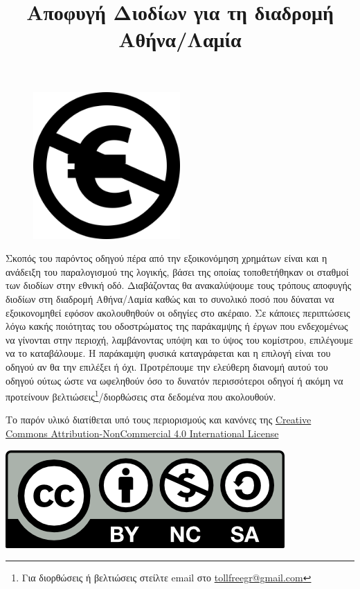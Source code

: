 \documentclass[a4paper,12pt]{article}
\title{\LARGE Αποφυγή Διοδίων για τη διαδρομή Αθήνα/Λαμία}
\date{}
\author{}
\begin{document}
\begin{titlepage}


\maketitle
\begin{figure}[hbp!]
	\centering
		\includegraphics[width=0.5\textwidth]{Nc-eu.svg.png}
\end{figure}
\abstract Σκοπός του παρόντος οδηγού πέρα από την εξοικονόμηση χρημάτων είναι και η ανάδειξη του παραλογισμού της λογικής, βάσει της οποίας τοποθετήθηκαν οι σταθμοί των διοδίων στην εθνική οδό. Διαβάζοντας θα ανακαλύψουμε τους τρόπους αποφυγής διοδίων στη διαδρομή Αθήνα/Λαμία καθώς και το συνολικό ποσό που δύναται να εξοικονομηθεί εφόσον ακολουθηθούν οι οδηγίες στο ακέραιο. Σε κάποιες περιπτώσεις λόγω κακής ποιότητας του οδοστρώματος της παράκαμψης ή έργων που ενδεχομένως να γίνονται στην περιοχή, λαμβάνοντας υπόψη και το ύψος του κομίστρου, επιλέγουμε να το καταβάλουμε. Η παράκαμψη φυσικά καταγράφεται και η επιλογή είναι του οδηγού αν θα την επιλέξει ή όχι. Προτρέπουμε την ελεύθερη διανομή αυτού του οδηγού ούτως ώστε να ωφεληθούν όσο το δυνατόν περισσότεροι οδηγοί ή ακόμη να προτείνουν βελτιώσεις\footnote{Για διορθώσεις ή βελτιώσεις στείλτε email στο \href{mailto:tollfreegr@gmail.com}{tollfreegr@gmail.com}}/διορθώσεις στα δεδομένα που ακολουθούν.
\vspace{1cm} 
\begin{center}
{\footnotesize Το παρόν υλικό διατίθεται υπό τους περιορισμούς και κανόνες της \href{http://creativecommons.org/licenses/by-nc/4.0/}{Creative Commons Attribution-NonCommercial 4.0 International License}}

\includegraphics[scale=0.85]{by-nc-sa1.png}
\end{center}
\thispagestyle{empty}
\end{titlepage}
\tableofcontents
\newpage


\end{document}
